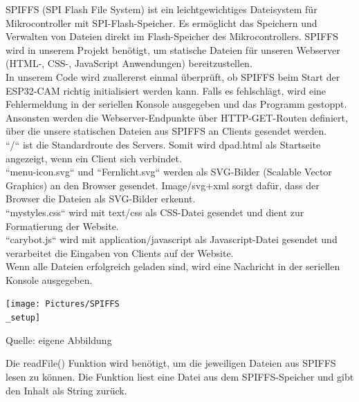 \documentclass[ngerman,12pt,a4paper]{article}
\begin{document}
	SPIFFS (SPI Flash File System) ist ein leichtgewichtiges Dateisystem für Mikrocontroller mit SPI-Flash-Speicher. Es ermöglicht das Speichern und Verwalten von Dateien direkt im Flash-Speicher des Mikrocontrollers. SPIFFS wird in unserem Projekt benötigt, um statische Dateien für unseren Webserver (HTML-, CSS-, JavaScript Anwendungen) bereitzustellen. \\[0.5cm] 
	In unserem Code wird zuallererst einmal überprüft, ob SPIFFS beim Start der ESP32-CAM richtig initialisiert werden kann. Falls es fehlschlägt, wird eine Fehlermeldung in der seriellen Konsole ausgegeben und das Programm gestoppt. Ansonsten werden die Webserver-Endpunkte über HTTP-GET-Routen definiert, über die unsere statischen Dateien aus SPIFFS an Clients gesendet werden. \\[0.5cm] 
	“/“ ist die Standardroute des Servers. Somit wird dpad.html als Startseite angezeigt, wenn ein Client sich verbindet. \\[0.5cm] 
	“menu-icon.svg“ und “Fernlicht.svg“ werden als SVG-Bilder (Scalable Vector Graphics) an den Browser gesendet. Image/svg+xml sorgt dafür, dass der Browser die Dateien als SVG-Bilder erkennt. \\[0.5cm] 
	“mystyles.css“ wird mit text/css als CSS-Datei gesendet und dient zur Formatierung der Website. \\[0.5cm] 
	“carybot.js“ wird mit application/javascript als Javascript-Datei gesendet und verarbeitet die Eingaben von Clients auf der Website. \\[0.5cm] 
	Wenn alle Dateien erfolgreich geladen sind, wird eine Nachricht in der seriellen Konsole ausgegeben. \\[0.5cm] 
	
	\begin{center}
		\begin{minipage}[t]{\textwidth}
			\texttt{[image: Pictures/SPIFFS\\\_setup]}
			\label{fig:spiffs_init}
			\vspace{-10pt}
			\begin{center}
				\par\small Quelle: eigene Abbildung
			\end{center}
		\end{minipage}
	\end{center}
	Die readFile() Funktion wird benötigt, um die jeweiligen Dateien aus SPIFFS lesen zu können. Die Funktion liest eine Datei aus dem SPIFFS-Speicher und gibt den Inhalt als String zurück.
	
\end{document}
